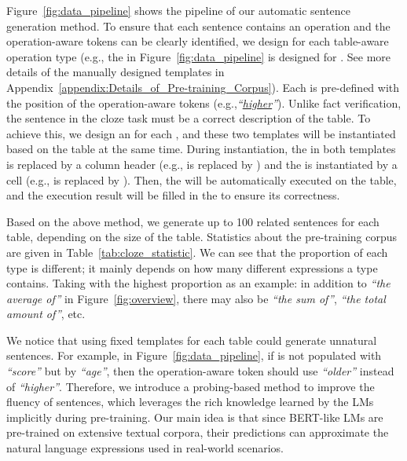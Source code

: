 \documentclass[11pt]{article}
\newcommand{\eg}{{e.g.,}\xspace}
\newcommand{\stitle}[1]{\vspace{1mm}\noindent{\bf #1}}
\newcommand{\term}[1]{\xspace}
\begin{document}
\stitle{Sentence Generation.} Figure~\ref{fig:data_pipeline} shows the pipeline of our automatic sentence generation method. 
To ensure that each sentence contains an operation and the operation-aware tokens can be clearly identified, we design \term{NL~Templates} for each table-aware operation type (\eg the \term{NL~Template} in Figure~\ref{fig:data_pipeline} is designed for \term{Comparative}. See more details of the manually designed templates in Appendix~\ref{appendix:Details_of_Pre-training_Corpus}). Each \term{NL~Template} is pre-defined with the position of the operation-aware tokens (\eg \textit{``\underline{higher}''}). 
Unlike fact verification, the sentence in the cloze task must be a correct description of the table. To achieve this, we design an \term{SQL~Template} for each \term{NL~Template}, and these two templates will be instantiated based on the table at the same time. During instantiation, the \term{[Column]} in both templates is replaced by a column header (\eg \term{[Column1]} is replaced by \term{team}) and the \term{[Value]} is instantiated by a cell (\eg \term{[Value]} is replaced by \term{97}). Then, the \term{SQL~Instance} will be automatically executed on the table, and the execution result \term{[ANS]} will be filled in the \term{NL~Instance} to ensure its correctness.

Based on the above method, we generate up to 100 related sentences for each table, depending on the size of the table.
Statistics about the pre-training corpus are given in Table~\ref{tab:cloze_statistic}. We can see that the proportion of each type is different; it mainly depends on how many different expressions a type contains. Taking \term{Aggregation} with the highest proportion as an example: in addition to \textit{``the average of''} in Figure~\ref{fig:overview}, there may also be \textit{``the sum of''}, \textit{``the total amount of''}, etc. 

\stitle{Sentence Polishing.} We notice that using fixed templates for each table could generate unnatural sentences. For example, in Figure~\ref{fig:data_pipeline}, if \term{[Column2]} is not populated with \textit{``score''} but by \textit{``age''}, then the operation-aware token should use \textit{``older''} instead of \textit{``higher''}. Therefore, we introduce a probing-based method to improve the fluency of sentences, which leverages the rich knowledge learned by the LMs implicitly during pre-training. Our main idea is that since BERT-like LMs are pre-trained on extensive textual corpora, their predictions can approximate the natural language expressions used in real-world scenarios. 
\end{document}
